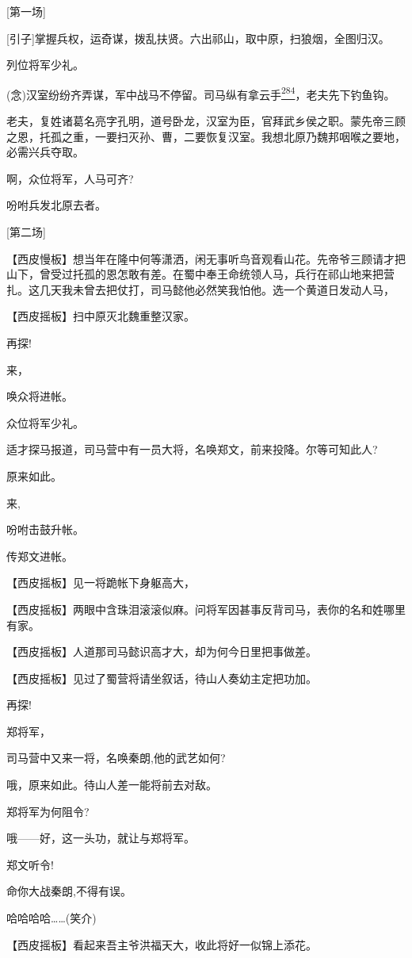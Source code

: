 {[}第一场{]}

{[}引子{]}掌握兵权，运奇谋，拨乱扶贤。六出祁山，取中原，扫狼烟，全图归汉。

列位将军少礼。

(念)汉室纷纷齐弄谋，军中战马不停留。司马纵有拿云手\protect\hyperlink{fn284}{\textsuperscript{284}}，老夫先下钓鱼钩。

老夫，复姓诸葛名亮字孔明，道号卧龙，汉室为臣，官拜武乡侯之职。蒙先帝三顾之恩，托孤之重，一要扫灭孙、曹，二要恢复汉室。我想北原乃魏邦咽喉之要地，必需兴兵夺取。

啊，众位将军，人马可齐?

吩咐兵发北原去者。

{[}第二场{]}

【西皮慢板】想当年在隆中何等潇洒，闲无事听鸟音观看山花。先帝爷三顾请才把山下，曾受过托孤的恩怎敢有差。在蜀中奉王命统领人马，兵行在祁山地来把营扎。这几天我未曾去把仗打，司马懿他必然笑我怕他。选一个黄道日发动人马，

【西皮摇板】扫中原灭北魏重整汉家。

再探!

来，

唤众将进帐。

众位将军少礼。

适才探马报道，司马营中有一员大将，名唤郑文，前来投降。尔等可知此人?

原来如此。

来,

吩咐击鼓升帐。

传郑文进帐。

【西皮摇板】见一将跪帐下身躯高大，

【西皮摇板】两眼中含珠泪滚滚似麻。问将军因甚事反背司马，表你的名和姓哪里有家。

【西皮摇板】人道那司马懿识高才大，却为何今日里把事做差。

【西皮摇板】见过了蜀营将请坐叙话，待山人奏幼主定把功加。

再探!

郑将军，

司马营中又来一将，名唤秦朗,他的武艺如何?

哦，原来如此。待山人差一能将前去对敌。

郑将军为何阻令?

哦------好，这一头功，就让与郑将军。

郑文听令!

命你大战秦朗,不得有误。

哈哈哈哈\ldots{}\ldots{}(笑介)

【西皮摇板】看起来吾主爷洪福天大，收此将好一似锦上添花。

